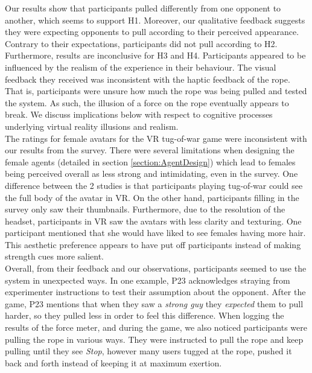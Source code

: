 Our results show that participants pulled differently from one opponent to another, which seems to support H1. Moreover, our qualitative feedback suggests they were expecting opponents to pull according to their perceived appearance. Contrary to their expectations, participants did not pull according to H2. Furthermore, results are inconclusive for H3 and H4. Participants appeared to be influenced by the realism of the experience in their behaviour. The visual feedback they received was inconsistent with the haptic feedback of the rope. That is, participants were unsure how much the rope was being pulled and tested the system. As such, the illusion of a force on the rope eventually appears to break. We discuss implications below with respect to cognitive processes underlying virtual reality illusions and realism.
\\
The ratings for female avatars for the VR tug-of-war game were inconsistent with our results from the survey. There were several limitations when designing the female agents (detailed in section \ref{section:AgentDesign}) which lead to females being perceived overall as less strong and intimidating, even in the survey. One difference between the 2 studies is that participants playing tug-of-war could see the full body of the avatar in VR. On the other hand, participants filling in the survey only saw their thumbnails. Furthermore, due to the resolution of the headset, participants in VR saw the avatars with less clarity and texturing. One participant mentioned that she would have liked to see females having more hair. This aesthetic preference appears to have put off participants instead of making strength cues more salient.
\\
Overall, from their feedback and our observations, participants seemed to use the system in unexpected ways. In one example, P23 acknowledges straying from experimenter instructions to test their assumption about the opponent. After the game, P23 mentions that when they saw a \textit{strong guy} they \textit{expected} them to pull harder, so they pulled less in order to feel this difference. When logging the results of the force meter, and during the game, we also noticed participants were pulling the rope in various ways. They were instructed to pull the rope and keep pulling until they see \textit{Stop}, however many  users tugged at the rope, pushed it back and forth instead of keeping it at maximum exertion.
\\

